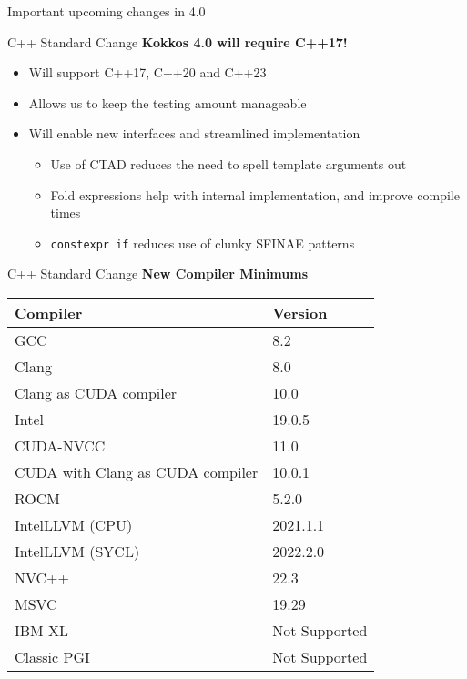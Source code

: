

\begin{frame}[fragile]

        {\Huge Important upcoming changes in 4.0}

  \vspace{-20pt}

\end{frame}


\begin{frame}[fragile]{C++ Standard Change}
\textbf{Kokkos 4.0 will require C++17!}

\begin{itemize}
  \item {Will support C++17, C++20 and C++23}
  \item {Allows us to keep the testing amount manageable}
  \item {Will enable new interfaces and streamlined implementation}
  \begin{itemize}
    \item {Use of CTAD reduces the need to spell template arguments out}
    \item {Fold expressions help with internal implementation, and improve compile times}
    \item {\texttt{constexpr if} reduces use of clunky SFINAE patterns}
  \end{itemize}
\end{itemize}
\end{frame}


\begin{frame}[fragile]{C++ Standard Change}
\textbf{New Compiler Minimums}

\vspace{10pt}
\small
\begin{tabular}{ll}
\textbf{Compiler} & \textbf{Version} \\
\hline
GCC & 8.2 \\
Clang & 8.0 \\
Clang as CUDA compiler & 10.0 \\
Intel & 19.0.5 \\
CUDA-NVCC & 11.0 \\
CUDA with Clang as CUDA compiler & 10.0.1 \\
ROCM & 5.2.0 \\
IntelLLVM (CPU) & 2021.1.1 \\
IntelLLVM (SYCL) & 2022.2.0 \\
NVC++ & 22.3 \\
MSVC & 19.29 \\
IBM XL & Not Supported \\
Classic PGI & Not Supported \\
\end{tabular}
\end{frame}

